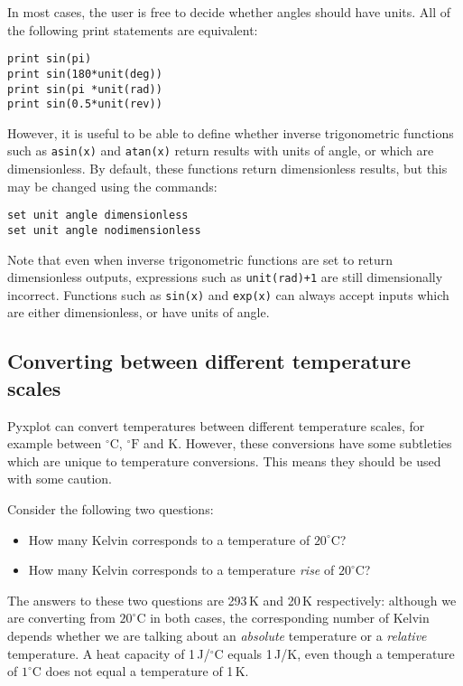 In most cases, the user is free to decide whether angles should have units. All
of the following print statements are equivalent:

\begin{verbatim}
print sin(pi)
print sin(180*unit(deg))
print sin(pi *unit(rad))
print sin(0.5*unit(rev))
\end{verbatim}

However, it is useful to be able to define whether inverse trigonometric
functions such as {\tt asin(x)} and {\tt atan(x)} return results with units of
angle, or which are dimensionless. By default, these functions return
dimensionless results, but this may be changed using the commands:

\begin{verbatim}
set unit angle dimensionless
set unit angle nodimensionless
\end{verbatim}

\noindent Note that even when inverse trigonometric functions are set to return
dimensionless outputs, expressions such as {\tt unit(rad)+1} are still
dimensionally incorrect. Functions such as {\tt sin(x)} and {\tt exp(x)}
can always accept inputs which are either dimensionless, or have units of
angle.

\subsection{Converting between different temperature scales}

Pyxplot can convert temperatures between different temperature scales, for
example between $^\circ\mathrm{C}$, $^\circ\mathrm{F}$ and K.  However, these
conversions have some subtleties which are unique to temperature conversions.
This means they should be used with some caution.

Consider the following two questions:
\begin{itemize}
\item How many Kelvin corresponds to a temperature of $20^\circ$C?
\item How many Kelvin corresponds to a temperature {\it rise} of $20^\circ$C?
\end{itemize}
The answers to these two questions are 293\,K and 20\,K respectively: although
we are converting from $20^\circ$C in both cases, the corresponding number of
Kelvin depends whether we are talking about an {\it absolute} temperature
or a {\it relative} temperature. A heat capacity of 1\,J/$^\circ$C equals
1\,J/K, even though a temperature of $1^\circ$C does not equal a temperature of
1\,K.

